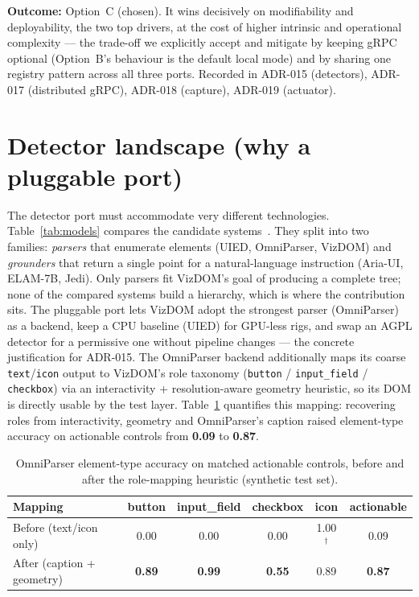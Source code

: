 \documentclass[11pt,a4paper]{report}
\newcommand{\code}[1]{\texttt{#1}}
\begin{document}
\textbf{Outcome:} Option~C (chosen). It wins decisively on modifiability and
deployability, the two top drivers, at the cost of higher intrinsic and operational
complexity --- the trade-off we explicitly accept and mitigate by keeping gRPC
optional (Option~B's behaviour is the default local mode) and by sharing one
registry pattern across all three ports. Recorded in ADR-015 (detectors), ADR-017
(distributed gRPC), ADR-018 (capture), ADR-019 (actuator).

\section{Detector landscape (why a pluggable port)}
The detector port must accommodate very different technologies. Table~\ref{tab:models}
compares the candidate systems~\cite{xie2020uied,omniparser2024,ariaui2024,elam7b,osworldg}.
They split into two families: \emph{parsers} that enumerate elements (UIED,
OmniParser, VizDOM) and \emph{grounders} that return a single point for a
natural-language instruction (Aria-UI, ELAM-7B, Jedi). Only parsers fit VizDOM's
goal of producing a complete tree; none of the compared systems build a hierarchy,
which is where the contribution sits. The pluggable port lets VizDOM adopt the
strongest parser (OmniParser) as a backend, keep a CPU baseline (UIED) for
GPU-less rigs, and swap an AGPL detector for a permissive one without pipeline
changes --- the concrete justification for ADR-015. The OmniParser backend
additionally maps its coarse \code{text}/\code{icon} output to VizDOM's role
taxonomy (\code{button} / \code{input\_field} / \code{checkbox}) via an
interactivity + resolution-aware geometry heuristic, so its DOM is directly usable
by the test layer. Table~\ref{tab:arc42typeacc} quantifies this mapping: recovering
roles from interactivity, geometry and OmniParser's caption raised element-type
accuracy on actionable controls from \textbf{0.09} to \textbf{0.87}.

\begin{table}[H]
  \centering\footnotesize
  \caption{OmniParser element-type accuracy on matched actionable controls, before
  and after the role-mapping heuristic (synthetic test set).}
  \label{tab:arc42typeacc}
  \begin{tabular}{@{}lccccc@{}}
    \toprule
    Mapping & button & input\_field & checkbox & icon & actionable \\
    \midrule
    Before (text/icon only) & 0.00 & 0.00 & 0.00 & 1.00$^\dagger$ & 0.09 \\
    After (caption + geometry) & \textbf{0.89} & \textbf{0.99} & \textbf{0.55} & 0.89 & \textbf{0.87} \\
    \bottomrule
  \end{tabular}
\end{table}
\end{document}
